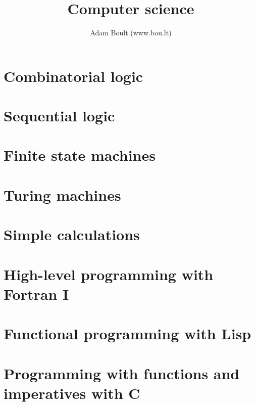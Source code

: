 \documentclass[oneside]{book}
\begin{document}
\author{Adam Boult (www.bou.lt)}
\title{Computer science}
\maketitle

\setcounter{tocdepth}{0}
\tableofcontents



\part{Combinatorial logic}




\part{Sequential logic}



\part{Finite state machines}



\part{Turing machines}







\part{Simple calculations}



\part{High-level programming with Fortran I}




\part{Functional programming with Lisp}





\part{Programming with functions and imperatives with C}







\end{document}
